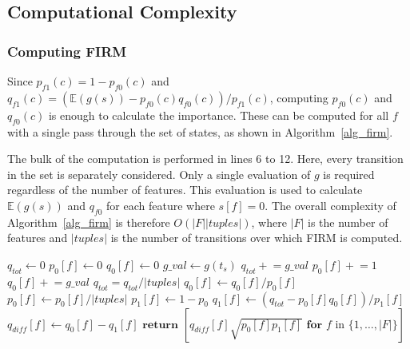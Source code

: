 \documentclass[letterpaper]{article} %
\newcommand{\pluseq}{\mathrel{+}=}
\begin{document}
\subsection{Computational Complexity}
\label{approach_computationalComplexity}

\subsubsection{Computing FIRM}
Since $p_{f1}(c) = 1 - p_{f0}(c)$ and $q_{f1}(c) = (\mathbb{E}(g(s)) - p_{f0}(c) q_{f0}(c)) / p_{f1}(c)$, computing $p_{f0}(c)$ and $q_{f0}(c)$ is enough to calculate the importance. These can be computed for all $f$ with a single pass through the set of states, as shown in Algorithm~\ref{alg_firm}.

The bulk of the computation is performed in lines 6 to 12. Here, every transition in the set is separately considered. Only a single evaluation of $g$ is required regardless of the number of features. This evaluation is used to calculate $\mathbb{E}(g(s))$ and $q_{f0}$ for each feature where $s[f] = 0$. The overall complexity of Algorithm~\ref{alg_firm} is therefore $O(|F| |tuples|)$, where $|F|$ is the number of features and $|tuples|$ is the number of transitions over which FIRM is computed.

\begin{algorithm}[t]
\caption{Compute feature importance for all features for given set of transitions.} \label{alg_firm}
\begin{algorithmic}[1]
\State $q_{tot} \leftarrow 0$ 
\State $p_0[f] \leftarrow 0$ 
\State $q_0[f] \leftarrow 0$ 
\EndFor
{}
\State $g\_val \leftarrow g(t_s)$
\State $q_{tot} \pluseq g\_val$ 
 
\State $p_0[f] \pluseq 1$
\State $q_0[f] \pluseq g\_val$
\EndIf
\EndFor
\EndFor
\State $q_{tot} = q_{tot} / |tuples|$ 
 
\State $q_0[f] \leftarrow q_0[f] / p_0[f]$
\State $p_0[f] \leftarrow p_0[f] / |tuples|$
\State $p_1[f] \leftarrow 1 - p_0$
\State $q_1[f] \leftarrow (q_{tot} - p_0[f] q_0[f]) / p_1[f]$
\State $q_{diff}[f] \leftarrow q_0[f] - q_1[f]$
\EndFor
\State $\textbf{return } [ q_{diff}[f] \sqrt{p_0[f] p_1[f]}
\textbf{ for } f \textrm{ in } \{1, \ldots, |F|\}]$
\EndProcedure
\end{algorithmic}
\end{algorithm}
\end{document}
